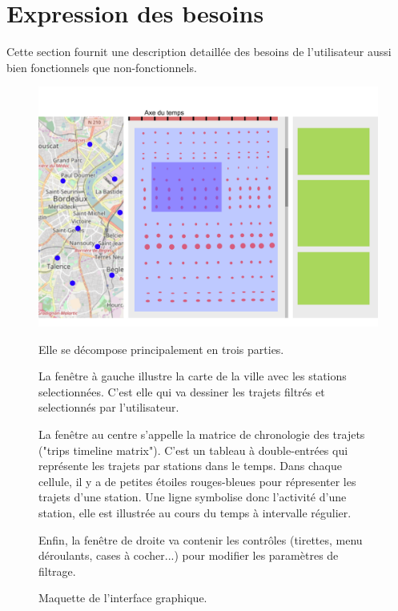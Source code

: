 \documentclass[12pt]{article}
\begin{document}
	\section{Expression des besoins}
		Cette section fournit une description detaillée des besoins de l'utilisateur aussi bien fonctionnels que non-fonctionnels.

		\begin{figure}[!ht]
		\includegraphics[scale=.5]{maquette.png}
		\caption{Maquette de l'interface graphique.}
		\medskip
		Elle se décompose principalement en trois parties.\par

		La fenêtre à gauche illustre la carte de la ville avec les stations selectionnées.
		C'est elle qui va dessiner les trajets filtrés et selectionnés par l'utilisateur.\par

		La fenêtre au centre s'appelle la matrice de chronologie des trajets ("trips timeline matrix").
		C'est un tableau à double-entrées qui représente les trajets par stations dans le temps.
		Dans chaque cellule, il y a de petites étoiles rouges-bleues pour répresenter les trajets d'une station.
		Une ligne symbolise donc l'activité d'une station, elle est illustrée au cours du temps à intervalle régulier.\par

		Enfin, la fenêtre de droite va contenir les contrôles (tirettes, menu déroulants, cases à cocher...) pour modifier les paramètres de filtrage.
		\end{figure}
\end{document}
